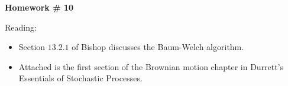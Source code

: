 \documentclass{article}
\begin{document}
\renewcommand{\a}{\textbf{a}}
\renewcommand{\b}{\textbf{b}}
\renewcommand{\d}{\textbf{d}}
\newcommand{\e}{\textbf{e}}

\large

\begin{center}
\textbf{Homework \# 10} \\  
\end{center}



\medskip


\newcommand{\normal}{\mathcal{N}}

Reading:
\begin{itemize}
\item Section $13.2.1$ of Bishop discusses the Baum-Welch algorithm.
\item Attached is the first section of the Brownian motion chapter in Durrett's Essentials of Stochastic Processes.
\end{itemize}
\end{document}
